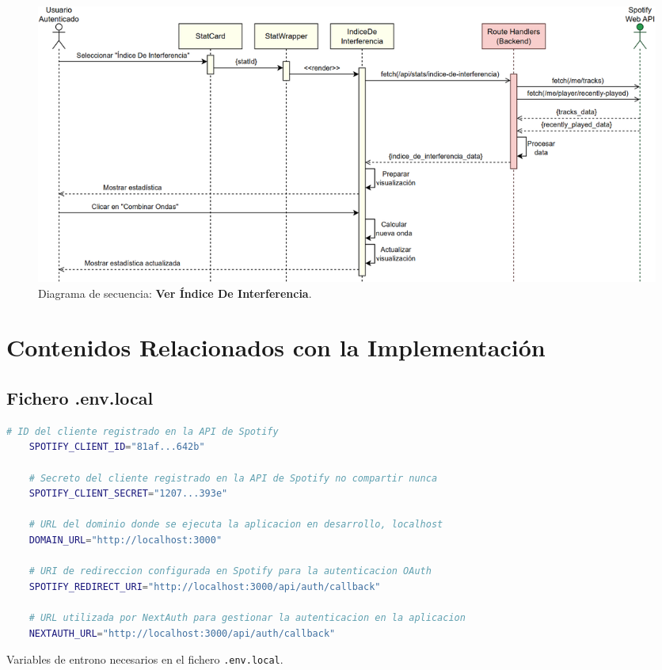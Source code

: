 \begin{figure}[H]
    \centering
    \includegraphics[width=\textwidth]{figures/diagramas_secuencia/ds_ver_indice_de_interferencia.png}
    \caption{Diagrama de secuencia: \textbf{Ver Índice De Interferencia}.}
    \label{fig:ds_ver_indice_de_interferencia}
\end{figure}


\chapter{Contenidos Relacionados con la Implementación} \label{ch:anexoC}

\section*{Fichero .env.local}

\begin{ifalgorithm}[H]
    \begin{lstlisting}[language=bash]
    # ID del cliente registrado en la API de Spotify
    SPOTIFY_CLIENT_ID="81af...642b"

    # Secreto del cliente registrado en la API de Spotify no compartir nunca
    SPOTIFY_CLIENT_SECRET="1207...393e"

    # URL del dominio donde se ejecuta la aplicacion en desarrollo, localhost
    DOMAIN_URL="http://localhost:3000"

    # URI de redireccion configurada en Spotify para la autenticacion OAuth
    SPOTIFY_REDIRECT_URI="http://localhost:3000/api/auth/callback"

    # URL utilizada por NextAuth para gestionar la autenticacion en la aplicacion
    NEXTAUTH_URL="http://localhost:3000/api/auth/callback"
    \end{lstlisting}
    \caption{Variables de entrono necesarios en el fichero \texttt{.env.local}.}
    \label{alg:variables_entorno}
\end{ifalgorithm}

